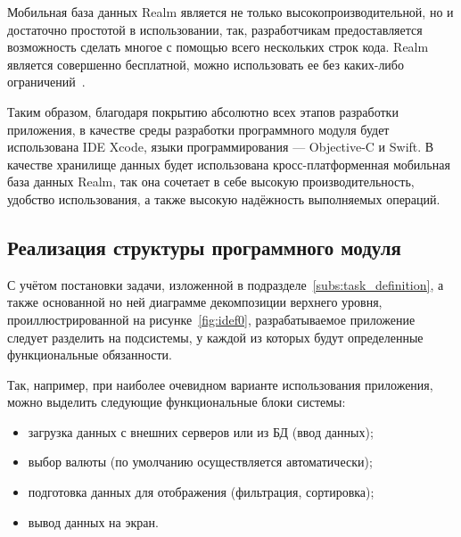 Мобильная база данных Realm является не только высокопроизводительной,
но и достаточно простотой в использовании, так, разработчикам предоставляется возможность
сделать многое с помощью всего нескольких строк кода. Realm является
совершенно бесплатной, можно использовать ее без каких-либо ограничений~\cite{todo_swift_realm}.


Таким образом, благодаря покрытию абсолютно всех этапов разработки приложения,
в качестве среды разработки программного модуля будет использована IDE Xcode,
языки программирования --- Objective-C и Swift.
В качестве хранилище данных будет использована кросс-платформенная мобильная
база данных Realm, так она сочетает в себе высокую производительность,
удобство использования, а также высокую надёжность выполняемых операций.

\pagebreak



\subsection{Реализация структуры программного модуля}

С учётом постановки задачи, изложенной в подразделе~\ref{subs:task_definition},
а также основанной но ней диаграмме декомпозиции верхнего уровня,
проиллюстрированной на рисунке~\ref{fig:idef0}, разрабатываемое
приложение следует разделить на подсистемы, у каждой из которых будут
определенные функциональные обязанности.

Так, например, при наиболее очевидном варианте использования приложения,
можно выделить следующие функциональные блоки системы:
\begin{itemize}
  \item загрузка данных с внешних серверов или из БД (ввод данных);
  \item выбор валюты (по умолчанию осуществляется автоматически);
  \item подготовка данных для отображения (фильтрация, сортировка);
  \item вывод данных на экран.
\end{itemize}

